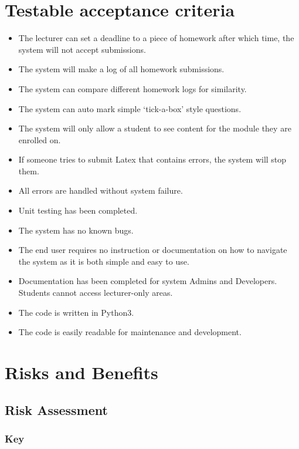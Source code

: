 \documentclass[12pt]{article}
\begin{document}
	\section{Testable acceptance criteria}
    \vspace{0.5cm}
    \begin{itemize}
\item The lecturer can set a deadline to a piece of homework after which time, the system will not accept submissions.
\item The system will make a log of all homework submissions.
\item The system can compare different homework logs for similarity.
\item The system can auto mark simple ‘tick-a-box’ style questions.
\item The system will only allow a student to see content for the module they are enrolled on.
\item If someone tries to submit Latex that contains errors, the system will stop them.
\item All errors are handled without system failure.
\item Unit testing has been completed.
\item The system has no known bugs.
\item The end user requires no instruction or documentation on how to navigate the system as it is both simple and easy to use.
\item Documentation has been completed for system Admins and Developers.
Students cannot access lecturer-only areas.
\item The code is written in Python3.
\item The code is easily readable for maintenance and development.
\end{itemize}
	

          	
	\section{Risks and Benefits}
	
    \subsection{Risk Assessment}
    
    
    \subsubsection{Key}
    
\end{document}
